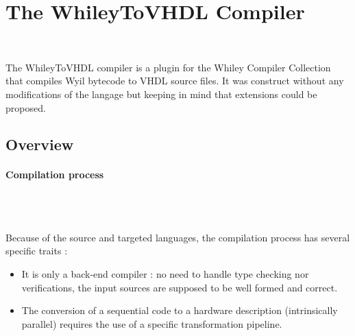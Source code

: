 \documentclass[10pt,a4paper]{article}
\renewcommand{\indent}{~\\\vspace{-.8cm}}
\newcommand{\pindent}{~\\\indent}
\begin{document}
\newpage
\section{The WhileyToVHDL Compiler}\indent

The WhileyToVHDL compiler is a plugin for the Whiley Compiler Collection that compiles Wyil bytecode to VHDL source files. It was construct without any modifications of the langage but keeping in mind that extensions could be proposed.

\subsection{Overview}

\paragraph{Compilation process}\pindent

%	


Because of the source and targeted languages, the compilation process has several specific traits :

\begin{itemize}
	\item It is only a back-end compiler : no need to handle type checking nor verifications, the input sources are supposed to be well formed and correct.
	\item The conversion of a sequential code to a hardware description (intrinsically parallel) requires the use of a specific transformation pipeline.
\end{itemize}
\end{document}
